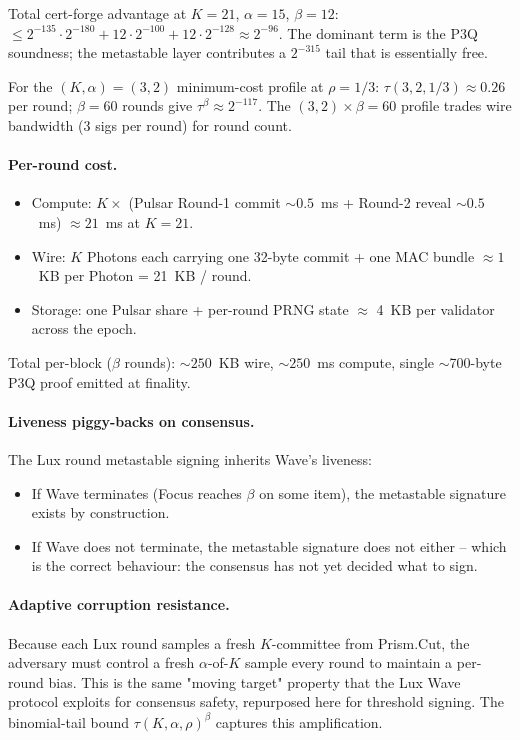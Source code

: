 \noindent Total cert-forge advantage at $K = 21$, $\alpha = 15$,
$\beta = 12$:
$\le 2^{-135} \cdot 2^{-180} + 12 \cdot 2^{-100} + 12 \cdot 2^{-128}
\approx 2^{-96}$. The dominant term is the P3Q soundness; the
metastable layer contributes a $2^{-315}$ tail that is essentially
free.

For the $(K, \alpha) = (3, 2)$ minimum-cost profile at $\rho = 1/3$:
$\tau(3, 2, 1/3) \approx 0.26$ per round; $\beta = 60$ rounds give
$\tau^\beta \approx 2^{-117}$. The $(3, 2) \times \beta = 60$ profile
trades wire bandwidth (3 sigs per round) for round count.

\paragraph{Per-round cost.}
\begin{itemize}[leftmargin=*, itemsep=0pt]
\item Compute: $K \times$ (Pulsar Round-1 commit $\sim 0.5$~ms +
Round-2 reveal $\sim 0.5$~ms) $\approx 21$~ms at $K = 21$.
\item Wire: $K$ Photons each carrying one 32-byte commit + one
MAC bundle $\approx 1$~KB per Photon = 21~KB / round.
\item Storage: one Pulsar share + per-round PRNG state $\approx$ 4~KB
per validator across the epoch.
\end{itemize}

Total per-block ($\beta$ rounds): $\sim 250$~KB wire, $\sim 250$~ms
compute, single $\sim$700-byte P3Q proof emitted at finality.

\paragraph{Liveness piggy-backs on consensus.}
The Lux round metastable signing inherits Wave's liveness:
\begin{itemize}[leftmargin=*, itemsep=0pt]
\item If Wave terminates (Focus reaches $\beta$ on some item),
the metastable signature exists by construction.
\item If Wave does not terminate, the metastable signature does not
either -- which is the correct behaviour: the consensus has not yet
decided what to sign.
\end{itemize}

\paragraph{Adaptive corruption resistance.}
Because each Lux round samples a fresh $K$-committee from
Prism.Cut, the adversary must control a fresh $\alpha$-of-$K$
sample every round to maintain a per-round bias. This is the same
"moving target" property that the Lux Wave protocol exploits for
consensus safety, repurposed here for threshold signing. The
binomial-tail bound $\tau(K, \alpha, \rho)^\beta$ captures this
amplification.

